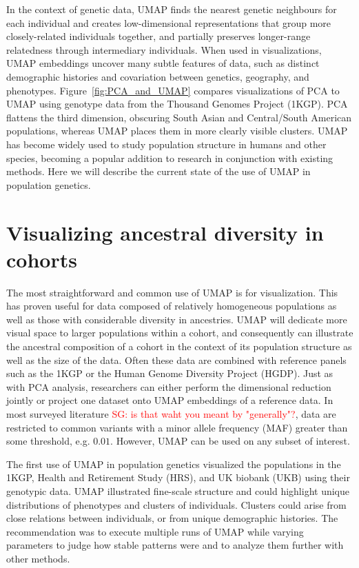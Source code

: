 \documentclass[12pt]{article}
\newcommand{\sgcomment}[1]{\textcolor{red}{SG: #1}}
\begin{document}
In the context of genetic data, UMAP finds the nearest genetic neighbours for each individual and creates low-dimensional representations that group more closely-related individuals together, and partially preserves longer-range relatedness through intermediary individuals. When used in visualizations, UMAP embeddings uncover many subtle features of data, such as distinct demographic histories and covariation between genetics, geography, and phenotypes\cite{diaz-papkovich_umap_2019}. Figure~\ref{fig:PCA_and_UMAP} compares visualizations of PCA to UMAP using genotype data from the Thousand Genomes Project (1KGP)\cite{10002015global}. PCA flattens the third dimension, obscuring South Asian and Central/South American populations, whereas UMAP places them in more clearly visible clusters. UMAP has become widely used to study population structure in humans and other species, becoming a popular addition to research in conjunction with existing methods. Here we will describe the current state of the use of UMAP in population genetics.

\section*{Visualizing ancestral diversity in cohorts}
The most straightforward and common use of UMAP is for visualization. This has proven useful for data composed of relatively homogeneous populations as well as those with considerable diversity in ancestries. UMAP will dedicate more visual space to larger populations within a cohort, and consequently can illustrate the ancestral composition of a cohort in the context of its population structure as well as the size of the data. Often these data are combined with reference panels such as the 1KGP or the Human Genome Diversity Project (HGDP)\cite{cann2002human}. Just as with PCA analysis, researchers can either perform the dimensional reduction jointly or project one dataset onto UMAP embeddings of a reference data. In most surveyed literature \sgcomment{is that waht you meant by "generally"?}, data are restricted to common variants with a minor allele frequency (MAF) greater than some threshold, e.g. $0.01$. However, UMAP can be used on any subset of interest.

The first use of UMAP in population genetics visualized the populations in the 1KGP, Health and Retirement Study (HRS)\cite{juster1995overview}, and UK biobank (UKB)\cite{sudlow2015uk} using their genotypic data. UMAP illustrated fine-scale structure and could highlight unique distributions of phenotypes and clusters of individuals. Clusters could arise from close relations between individuals, or from unique demographic histories. The recommendation was to execute multiple runs of UMAP while varying parameters to judge how stable patterns were and to analyze them further with other methods\cite{diaz-papkovich_umap_2019}.
\end{document}
